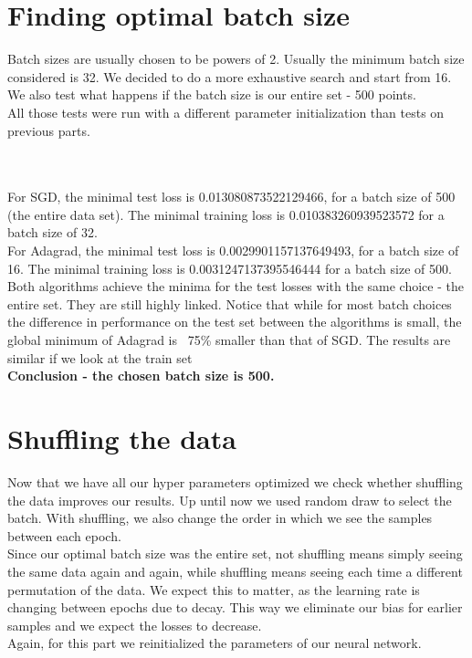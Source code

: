 \documentclass[12pt]{scrartcl}
\begin{document}
\section{Finding optimal batch size}
Batch sizes are usually chosen to be powers of 2. Usually the minimum batch size considered is 32. We decided to do a more exhaustive search and start from 16. We also test what happens if the batch size is our entire set - 500 points.\\
All those tests were run with a different parameter initialization than tests on previous parts.

\\\\

For SGD, the minimal test loss is 0.013080873522129466, for a batch size of 500 (the entire data set). The minimal training loss is 0.010383260939523572 for a batch size of 32.\\
For Adagrad, the minimal test loss is 0.0029901157137649493, for a batch size of 16. The minimal training loss is 0.0031247137395546444  for a batch size of 500.\\
Both algorithms achieve the minima for the test losses with the same choice - the entire set. They are still highly linked. Notice that while for most batch choices the difference in performance on the test set between the algorithms is small, the global minimum of Adagrad is ~75\% smaller than that of SGD. The results are similar if we look at the train set\\
\textbf{Conclusion - the chosen batch size is 500.}

\section{Shuffling the data}
Now that we have all our hyper parameters optimized we check whether shuffling the data improves our results. Up until now we used random draw to select the batch. With shuffling, we also change the order in which we see the samples between each epoch.\\
Since our optimal batch size was the entire set, not shuffling means simply seeing the same data again and again, while shuffling means seeing each time a different permutation of the data. We expect this to matter, as the learning rate is changing between epochs due to decay. This way we eliminate our bias for earlier samples and we expect the losses to decrease.\\
Again, for this part we reinitialized the parameters of our neural network.\\
\end{document}
